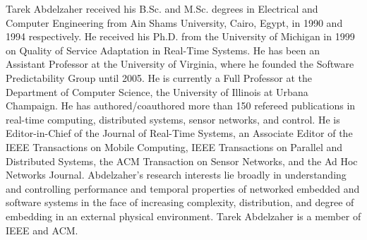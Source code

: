\documentclass[10pt,journal,letterpaper,compsoc, draftclsnofoot, onecolumn]{IEEEtran} %
\begin{document}
\begin{IEEEbiographynophoto}{Tarek Abdelzaher}
received his B.Sc. and M.Sc. degrees in Electrical and Computer Engineering from Ain Shams University, Cairo, Egypt, in 1990 and 1994 respectively. 
He received his Ph.D. from the University of Michigan in 1999 on Quality of Service Adaptation in Real-Time Systems. 
He has been an Assistant Professor at the University of Virginia, where he founded the Software Predictability Group until 2005. 
He is currently a Full Professor at the Department of Computer Science, the University of Illinois at Urbana Champaign. 
He has authored/coauthored more than 150 refereed publications in real-time computing, distributed systems, sensor networks, and control. 
He is Editor-in-Chief of the Journal of Real-Time Systems, an Associate Editor of the IEEE Transactions on Mobile Computing, IEEE Transactions on Parallel and Distributed Systems, the ACM Transaction on Sensor Networks, and the Ad Hoc Networks Journal. 
Abdelzaher's research interests lie broadly in understanding and controlling performance and temporal properties of networked embedded and software systems in the face of increasing complexity, distribution, and degree of embedding in an external physical environment. 
Tarek Abdelzaher is a member of IEEE and ACM.
\end{IEEEbiographynophoto}
\end{document}
